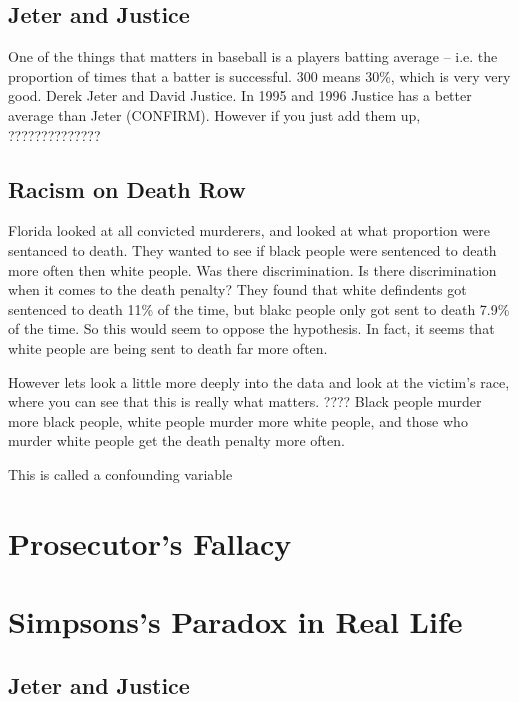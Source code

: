 \documentclass{report}
\begin{document}
\subsection{Jeter and Justice}
\todo One of the things that matters in baseball is a players batting average -- i.e. the proportion of times that a batter is successful. 300 means 30\%, which is very very good. Derek Jeter and David Justice. In 1995 and 1996 Justice has a better average than Jeter (CONFIRM). However if you just add them up, 
??????????????
\subsection{Racism on Death Row}
\todo Florida looked at all convicted murderers, and looked at what proportion were sentanced to death. They wanted to see if black people were sentenced to death more often then white people. Was there discrimination. Is there discrimination when it comes to the death penalty? They found that white defindents got sentenced to death 11\% of the time, but blakc people only got sent to death 7.9\% of the time. So this would seem to oppose the hypothesis. In fact, it seems that white people are being sent to death far more often. 

However lets look a little more deeply into the data and look at the victim's race, where you can see that this is really what matters. ???? Black people murder more black people, white people murder more white people, and those who murder white people get the death penalty more often. 

This is called a confounding variable





\newpage









\section{Prosecutor's Fallacy}


\section{Simpsons's Paradox in Real Life}
\subsection{Jeter and Justice}
\end{document}
